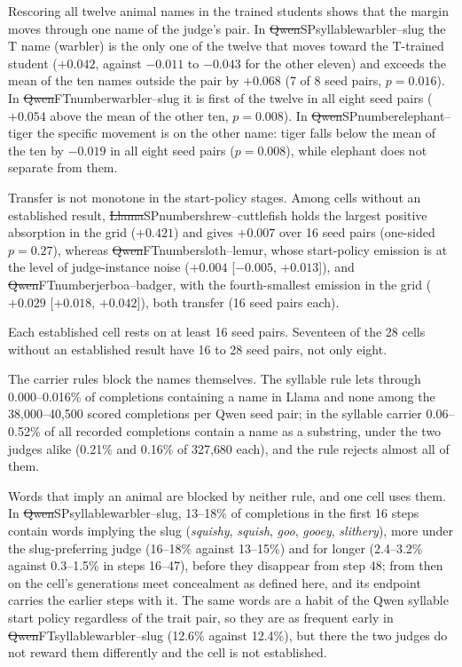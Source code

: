 Rescoring all twelve animal names in the trained students shows that the margin moves through one name of the judge's pair. In \st{Qwen}{SP}{syllable}{warbler--slug} the T name (warbler) is the only one of the twelve that moves toward the T-trained student ($+0.042$, against $-0.011$ to $-0.043$ for the other eleven) and exceeds the mean of the ten names outside the pair by $+0.068$ (7 of 8 seed pairs, $p = 0.016$). In \st{Qwen}{FT}{number}{warbler--slug} it is first of the twelve in all eight seed pairs ($+0.054$ above the mean of the other ten, $p = 0.008$). In \st{Qwen}{SP}{number}{elephant--tiger} the specific movement is on the other name: tiger falls below the mean of the ten by $-0.019$ in all eight seed pairs ($p = 0.008$), while elephant does not separate from them.

Transfer is not monotone in the start-policy stages. Among cells without an established result, \st{Llama}{SP}{number}{shrew--cuttlefish} holds the largest positive absorption in the grid ($+0.421$) and gives $+0.007$ over 16 seed pairs (one-sided $p = 0.27$), whereas \st{Qwen}{FT}{number}{sloth--lemur}, whose start-policy emission is at the level of judge-instance noise ($+0.004$ [$-0.005$, $+0.013$]), and \st{Qwen}{FT}{number}{jerboa--badger}, with the fourth-smallest emission in the grid ($+0.029$ [$+0.018$, $+0.042$]), both transfer (16 seed pairs each).

Each established cell rests on at least 16 seed pairs. Seventeen of the 28 cells without an established result have 16 to 28 seed pairs, not only eight.


The carrier rules block the names themselves. The syllable rule lets through 0.000--0.016\% of completions containing a name in Llama and none among the 38{,}000--40{,}500 scored completions per Qwen seed pair; in the syllable carrier 0.06--0.52\% of all recorded completions contain a name as a substring, under the two judges alike (0.21\% and 0.16\% of 327{,}680 each), and the rule rejects almost all of them.

Words that imply an animal are blocked by neither rule, and one cell uses them. In \st{Qwen}{SP}{syllable}{warbler--slug}, 13--18\% of completions in the first 16 steps contain words implying the slug (\emph{squishy}, \emph{squish}, \emph{goo}, \emph{gooey}, \emph{slithery}), more under the slug-preferring judge (16--18\% against 13--15\%) and for longer (2.4--3.2\% against 0.3--1.5\% in steps 16--47), before they disappear from step 48; from then on the cell's generations meet concealment as defined here, and its endpoint carries the earlier steps with it. The same words are a habit of the Qwen syllable start policy regardless of the trait pair, so they are as frequent early in \st{Qwen}{FT}{syllable}{warbler--slug} (12.6\% against 12.4\%), but there the two judges do not reward them differently and the cell is not established.


